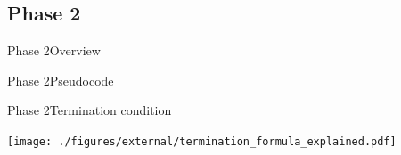 \documentclass[aspectratio=169, hyperref={colorlinks=true, allcolors=SecondaryColor}, c]{beamer}
\begin{document}
\ifattackphasetwo
	\subsection{Phase 2}

	\begin{frame}[fragile]{Phase 2}{Overview}
		\vspace{0.5cm}

		\begin{adjustbox}{max width=\textwidth}
		\end{adjustbox}
	\end{frame}

	\begin{frame}[fragile]{Phase 2}{Pseudocode}
		\begin{center}
			\begin{adjustbox}{scale=0.7}
				
			\end{adjustbox}
		\end{center}
	\end{frame}

	\begin{frame}[fragile]{Phase 2}{Termination condition}
		\vspace{0.2cm}

		\texttt{[image: ./figures/external/termination\_formula\_explained.pdf]}
	\end{frame}
\end{document}
